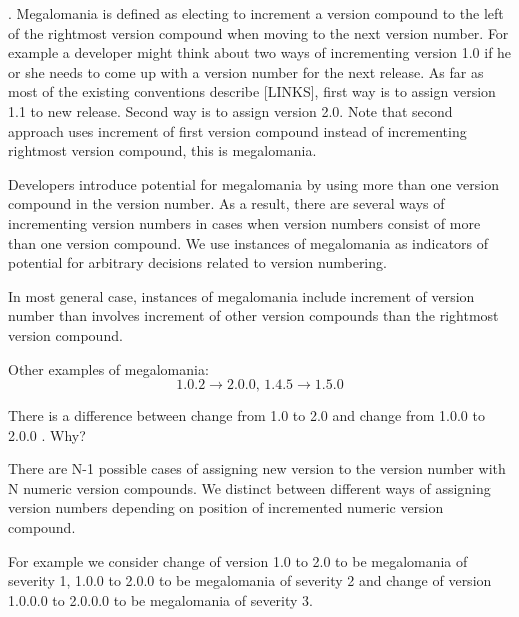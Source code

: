\documentclass[conference]{IEEEtran}
\begin{document}
%

 
. Megalomania is defined as electing to increment a version compound to the left of the rightmost version compound when moving to the next version number.
For example a developer might think about two ways of incrementing version 1.0 if he or she needs to come up with a version number for the next release.
 As far as most of the existing conventions describe [LINKS], first way is to assign version 1.1 to new release. Second way is to assign version 2.0. Note that second approach uses increment of first version compound instead of incrementing rightmost version compound, this is megalomania. 

Developers introduce potential for megalomania by using more than one version compound in the version number. As a result, there are several ways of incrementing version numbers in cases when version numbers consist of more than one version compound. We use instances of megalomania as indicators of potential for arbitrary decisions related to version numbering. 

In most general case, instances of megalomania include increment of version number than involves increment of other version compounds than the rightmost version compound.

Other examples of megalomania: $$ 1.0.2 \rightarrow 2.0.0 \texttt{, } 1.4.5 \rightarrow 1.5.0 $$

There is a difference between change from 1.0 to 2.0 and change from 1.0.0 to 2.0.0 . Why? 

There are N-1 possible cases of assigning new version to the version number with N numeric version compounds. We distinct between different ways of assigning version numbers depending on position of incremented numeric version compound. 

For example we consider change of version 1.0 to 2.0 to be megalomania of severity 1, 1.0.0 to 2.0.0 to be megalomania of severity 2 and change of version 1.0.0.0 to 2.0.0.0 to be megalomania of severity 3.
\end{document}
